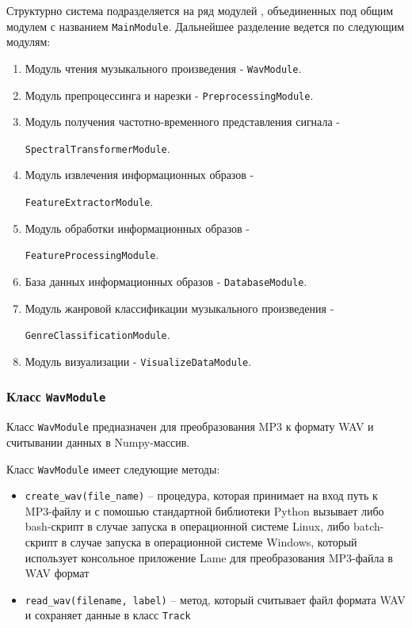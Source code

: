 Структурно система подразделяется на ряд модулей , объединенных под общим модулем с названием \texttt{MainModule}. Дальнейшее разделение ведется по следующим модулям:
\begin{enumerate}[label=\arabic*.]
\item{Модуль чтения музыкального произведения - \texttt{WavModule}.}
\item{Модуль препроцессинга и нарезки - \texttt{PreprocessingModule}.}
\item{Модуль получения частотно-временного представления сигнала -
 
\texttt{SpectralTransformerModule}.}
\item{Модуль извлечения информационных образов -

\texttt{FeatureExtractorModule}.}
\item{Модуль обработки информационных образов - 

\texttt{FeatureProcessingModule}. }
\item{База данных информационных образов - \texttt{DatabaseModule}.}
\item{Модуль жанровой классификации музыкального произведения -

\texttt{GenreClassificationModule}.}
\item{Модуль визуализации - \texttt{VisualizeDataModule}.}
\end{enumerate}

\subsubsection{Класс \texttt{WavModule}}

Класс \texttt{WavModule} предназначен для преобразования MP3 к формату WAV и считывании данных в Numpy-массив. 

Класс \texttt{WavModule} имеет следующие методы:

\begin{itemize}
\item{\texttt{create_wav(file_name)} -- процедура, которая принимает на вход путь к MP3-файлу и с помошью стандартной библиотеки Python вызывает либо bash-скрипт в случае запуска в операционной системе Linux, либо batch-скрипт в случае запуска в операционной системе Windows, который использует консольное приложение Lame для преобразования MP3-файла в WAV формат}
\item{\texttt{read_wav(filename, label)} -- метод, который считывает файл формата WAV и сохраняет данные в класс \texttt{Track}}
\end{itemize}


